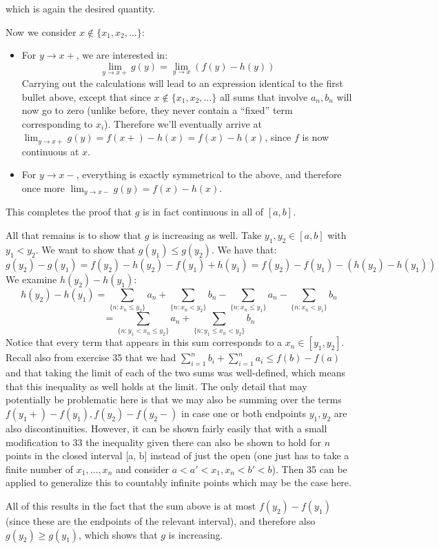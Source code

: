 \begin{solution}
\begin{itemize}
        which is again the desired quantity.
    \end{itemize}
    Now we consider $x \notin \{x_1, x_2, \ldots\}$:
    \begin{itemize}
        \item For $y \rightarrow x+$, we are interested in:
        $$\lim_{y \rightarrow x+}g(y) = \lim_{y \rightarrow x} (f(y) - h(y))$$
        Carrying out the calculations will lead to an expression identical to the first bullet above, except that since $x \notin \{x_1, x_2, \ldots\}$ all sums that involve $a_n, b_n$ will now go to zero (unlike before, they never contain a ``fixed'' term corresponding to $x_i$).
        Therefore we'll eventually arrive at $\lim_{y \rightarrow x+} g(y) = f(x+) - h(x) = f(x) - h(x)$, since $f$ is now continuous at $x$.
        \item For $y \rightarrow x-$, everything is exactly symmetrical to the above, and therefore once more $\lim_{y \rightarrow x-} g(y) = f(x) - h(x)$.
    \end{itemize}
    This completes the proof that $g$ is in fact continuous in all of $[a, b]$.

    All that remains is to show that $g$ is increasing as well.
    Take $y_1, y_2 \in [a, b]$ with $y_1 < y_2$.
    We want to show that $g(y_1) \leq g(y_2)$.
    We have that:
    $$g(y_2) - g(y_1) = f(y_2) - h(y_2) - f(y_1) + h(y_1) = f(y_2) - f(y_1) - (h(y_2) - h(y_1))$$
    We examine $h(y_2) - h(y_1)$:
    $$h(y_2) - h(y_1) = \sum_{\{n: x_n \leq y_2\}} a_n + \sum_{\{n: x_n < y_2\}} b_n - \sum_{\{n: x_n \leq y_1\}} a_n - \sum_{\{n: x_n < y_1\}} b_n$$
    $$= \sum_{\{n: y_1 < x_n \leq y_2\}} a_n + \sum_{\{n: y_1 \leq x_n < y_2\}} b_n$$
    Notice that every term that appears in this sum corresponds to a $x_n \in [y_1, y_2]$.
    Recall also from exercise 35 that we had $\sum_{i=1}^{n} b_i + \sum_{i = 1}^{n} a_i \leq f(b) - f(a)$ and that taking the limit of each of the two sums was well-defined, which means that this inequality as well holds at the limit.
    The only detail that may potentially be problematic here is that we may also be summing over the terms $f(y_1+) - f(y_1), f(y_2) - f(y_2-)$ in case one or both endpoints $y_1, y_2$ are also discontinuities.
    However, it can be shown fairly easily that with a small modification to 33 the inequality given there can also be shown to hold for $n$ points in the closed interval [a, b] instead of just the open (one just has to take a finite number of $x_1, \ldots, x_n$ and consider $a < a' < x_1, x_n < b' < b$).
    Then 35 can be applied to generalize this to countably infinite points which may be the case here.
    
    All of this results in the fact that the sum above is at most $f(y_2) - f(y_1)$ (since these are the endpoints of the relevant interval), and therefore also $g(y_2) \geq g(y_1)$, which shows that $g$ is increasing.
\end{solution}